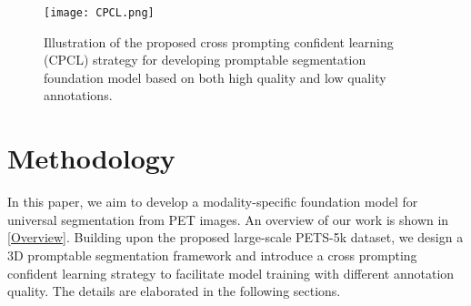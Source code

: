 \begin{figure*}[t]
	\texttt{[image: CPCL.png]}
	\caption{Illustration of the proposed cross prompting confident learning (CPCL) strategy for developing promptable segmentation foundation model based on both high quality and low quality annotations.}
	\label{CPCL}
\end{figure*}


\section{Methodology}

In this paper, we aim to develop a modality-specific foundation model for universal segmentation from PET images. An overview of our work is shown in \cref{Overview}.
Building upon the proposed large-scale PETS-5k dataset, we design a 3D promptable segmentation framework and introduce a cross prompting confident learning strategy to facilitate model training with different annotation quality.
The details are elaborated in the following sections.




